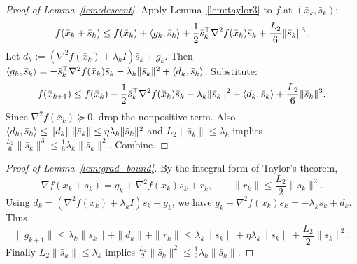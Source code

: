 \documentclass[review,onefignum,onetabnum]{siamart171218}
\begin{document}
\begin{proof}[Proof of Lemma~\ref{lem:descent}]
Apply Lemma~\ref{lem:taylor3} to $f$ at $(\bar x_k,\bar s_k)$:
\[
f(\bar x_k+\bar s_k)\le f(\bar x_k)+\left\langle g_k,\bar s_k\right\rangle+\frac12\bar s_k^\top\nabla^2 f(\bar x_k)\bar s_k+\frac{L_2}{6}\|\bar s_k\|^3.
\]
Let $d_k:=(\nabla^2 f(\bar x_k)+\lambda_k I)\bar s_k+g_k$.
Then $\left\langle g_k,\bar s_k\right\rangle=-\bar s_k^\top\nabla^2 f(\bar x_k)\bar s_k-\lambda_k\|\bar s_k\|^2+\left\langle d_k,\bar s_k\right\rangle$.
Substitute:
\[
f(\bar x_{k+1})\le f(\bar x_k)-\frac12\bar s_k^\top\nabla^2 f(\bar x_k)\bar s_k-\lambda_k\|\bar s_k\|^2+\left\langle d_k,\bar s_k\right\rangle+\frac{L_2}{6}\|\bar s_k\|^3.
\]
Since $\nabla^2 f(\bar x_k)\succeq 0$, drop the nonpositive term. Also
$\left\langle d_k,\bar s_k\right\rangle\le \|d_k\|\,\|\bar s_k\|\le \eta\lambda_k\|\bar s_k\|^2$
and $L_2\|\bar s_k\|\le \lambda_k$ implies $\frac{L_2}{6}\|\bar s_k\|^3\le \frac16\lambda_k\|\bar s_k\|^2$.
Combine.
\end{proof}

\begin{proof}[Proof of Lemma~\ref{lem:grad_bound}]
By the integral form of Taylor's theorem,
\[
\nabla f(\bar x_k+\bar s_k)=g_k+\nabla^2 f(\bar x_k)\bar s_k+r_k,
\qquad \|r_k\|\le \frac{L_2}{2}\|\bar s_k\|^2.
\]
Using $d_k=(\nabla^2 f(\bar x_k)+\lambda_k I)\bar s_k+g_k$, we have
$g_k+\nabla^2 f(\bar x_k)\bar s_k=-\lambda_k\bar s_k+d_k$.
Thus
\[
\|g_{k+1}\|\le \lambda_k\|\bar s_k\|+\|d_k\|+\|r_k\|
\le \lambda_k\|\bar s_k\|+\eta\lambda_k\|\bar s_k\|+\frac{L_2}{2}\|\bar s_k\|^2.
\]
Finally $L_2\|\bar s_k\|\le \lambda_k$ implies $\frac{L_2}{2}\|\bar s_k\|^2\le \frac12\lambda_k\|\bar s_k\|$.
\end{proof}
\end{document}
